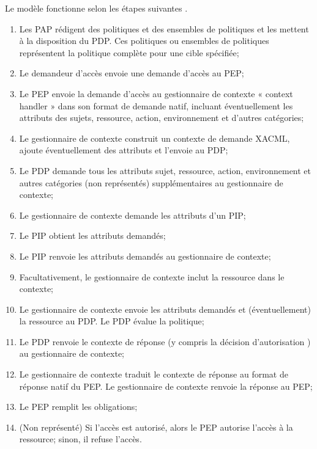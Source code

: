 \hspace*{0.5cm} Le modèle fonctionne selon les étapes suivantes \cite{standard13}.
\begin{enumerate}
\item Les PAP rédigent des politiques et des ensembles de politiques et les mettent à la disposition du PDP. Ces politiques ou ensembles de politiques représentent la politique complète pour une cible spécifiée;
\item Le demandeur d'accès envoie une demande d'accès au PEP;
\item Le PEP envoie la demande d'accès au gestionnaire de contexte « context handler » dans son format de demande natif, incluant éventuellement les attributs des sujets, ressource, action, environnement et d'autres catégories;
\item Le gestionnaire de contexte construit un contexte de demande XACML, ajoute éventuellement des attributs et l'envoie au PDP;
\item Le PDP demande tous les attributs sujet, ressource, action, environnement et autres catégories (non représentés) supplémentaires au gestionnaire de contexte;
\item Le gestionnaire de contexte demande les attributs d'un PIP;
\item Le PIP obtient les attributs demandés;
\item Le PIP renvoie les attributs demandés au gestionnaire de contexte;
\item Facultativement, le gestionnaire de contexte inclut la ressource dans le contexte;
\item Le gestionnaire de contexte envoie les attributs demandés et (éventuellement) la ressource au PDP. Le PDP évalue la politique;
\item Le PDP renvoie le contexte de réponse (y compris la décision d'autorisation ) au gestionnaire de contexte;
\item Le gestionnaire de contexte traduit le contexte de réponse au format de réponse natif du PEP. Le gestionnaire de contexte renvoie la réponse au PEP;
\item Le PEP remplit les obligations;
\item (Non représenté) Si l'accès est autorisé, alors le PEP autorise l'accès à la ressource; sinon, il refuse l'accès.

\end{enumerate}

\label{sectionStructureXACML}

